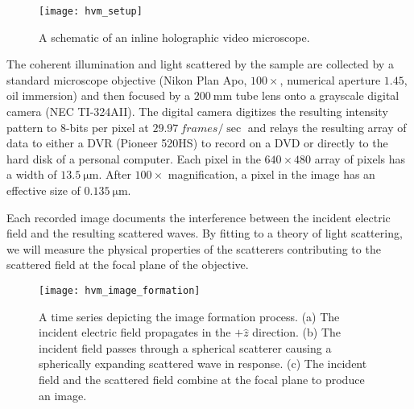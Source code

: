 \begin{figure}
  \centering
  \texttt{[image: hvm\_setup]}
  \caption{A schematic of an inline holographic video microscope.}
  \label{fig:hvm_setup}
\end{figure}


The coherent illumination and light scattered by the sample are collected by a
standard microscope objective (Nikon Plan Apo, $\num{100}\times$,
numerical aperture $\num{1.45}$, oil immersion) and then focused
by a $\SI{200}{\mm}$ tube lens onto a grayscale digital camera
(NEC TI-324AII). The digital camera digitizes the resulting intensity
pattern to $8$-bits per pixel at $\SI{29.97}{frames / \sec}$ and relays the
resulting array of data to either a DVR (Pioneer 520HS) to record
on a DVD or directly to the hard disk of a personal computer.
Each pixel in the $\si{640\times 480}$ array of pixels has a width of
$\SI{13.5}{\um}$. After $100\times$ magnification, a pixel in the
image has an effective size of $\SI{0.135}{\um}$.

Each recorded image documents the interference between the incident
electric field and the resulting scattered waves. By fitting
to a theory of light scattering, we will measure the physical
properties of the scatterers contributing to the scattered field
at the focal plane of the objective.





\begin{figure}
  \centering
  \texttt{[image: hvm\_image\_formation]}
  \caption{A time series depicting the image formation process. (a) The incident
    electric field propagates in the $+\hat{z}$ direction. (b) The
    incident field passes through a spherical scatterer causing a
    spherically expanding scattered wave in response. (c) The incident
    field and the scattered field combine at the focal plane to produce
    an image.}
  \label{fig:image_formation}
\end{figure}


